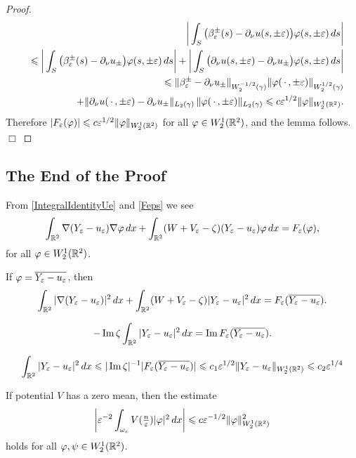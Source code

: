 \begin{proof}
\begin{eqnarray}
&&\bigg|\int_S \big(\beta_\varepsilon^\pm(s)-\partial_\nu u(s,\pm\varepsilon)\big)\varphi(s,\pm\varepsilon)\,ds\bigg|\\\nonumber
&&\leqslant\bigg|\int_S \big(\beta_\varepsilon^\pm(s)-\partial_\nu u_\pm\big)\varphi(s,\pm\varepsilon)\,ds\bigg|+
\bigg|\int_S \big(\partial_\nu u(s,\pm\varepsilon)-\partial_\nu u_\pm\big)\varphi(s,\pm\varepsilon)\,ds\bigg|
\\\nonumber
&&\leqslant \|\beta_\varepsilon^\pm-\partial_\nu u_\pm\|_{W_2^{-1/2}(\gamma)} \|\varphi(\,\cdot\,,\pm\varepsilon)\|_{W_2^{1/2}(\gamma)}\\\nonumber
&&\kern40pt+\|\partial_\nu u(\,\cdot\,,\pm\varepsilon)-\partial_\nu u_\pm\|
_{L_2(\gamma )}\,\|\varphi(\,\cdot\,,\pm\varepsilon)\|_{L_2(\gamma)}\leqslant c\varepsilon^{1/2} \|\varphi\|_{W_2^1(\mathbb R^2)}.
\end{eqnarray}
Therefore $|F_\varepsilon(\varphi)|\leqslant c\varepsilon^{1/2}\|\varphi\|_{W_2^1(\mathbb R^2)}$
for all $\varphi\in W_2^1(\mathbb R^2)$, and the lemma follows.
\hfill$\Box$
\end{proof}



\subsection{The End of the Proof}

From \eqref{IntegralIdentityUe} and  \eqref{Feps} we see
$$
\int_{\mathbb R^2}\nabla (Y_\varepsilon-u_\varepsilon) \nabla \varphi\,dx+
             \int_{\mathbb R^2} (W+V_\varepsilon-\zeta)(Y_\varepsilon-u_\varepsilon) \varphi\,dx=F_\varepsilon(\varphi),
$$
for all $\varphi\in W_2^1(\mathbb R^2)$.





If $\varphi=\overline{Y_\varepsilon-u_\varepsilon}$, then
$$
\int_{\mathbb R^2}|\nabla (Y_\varepsilon-u_\varepsilon)|^2\,dx+
             \int_{\mathbb R^2} (W+V_\varepsilon-\zeta)|Y_\varepsilon-u_\varepsilon|^2\,dx=F_\varepsilon(\overline{Y_\varepsilon-u_\varepsilon}).
$$

$$
-\mathop{\rm Im} \zeta \int_{\mathbb R^2}|Y_\varepsilon-u_\varepsilon|^2\,dx=\mathop{\rm Im} F_\varepsilon(\overline{Y_\varepsilon-u_\varepsilon}).
$$


$$
 \int_{\mathbb R^2}|Y_\varepsilon-u_\varepsilon|^2\,dx\leqslant |\mathop{\rm Im} \zeta|^{-1} |F_\varepsilon(\overline{Y_\varepsilon-u_\varepsilon})|\leqslant c_1\varepsilon^{1/2}\|Y_\varepsilon-u_\varepsilon\|_{W_2^1(\mathbb R^2)}\leqslant c_2\varepsilon^{1/4}
$$

\begin{lemma}
If potential $V$ has a zero mean, then the estimate
$$
  \left|\varepsilon^{-2}\int_{\omega_\varepsilon}V(\textstyle\frac n{\varepsilon})|\varphi|^2 \,dx\right|\leqslant c\varepsilon^{-1/2}\|\varphi\|_{W_2^1(\mathbb R^2)}^2
$$
holds for all $\varphi, \psi \in W_2^1(\mathbb R^2)$.
\end{lemma}

